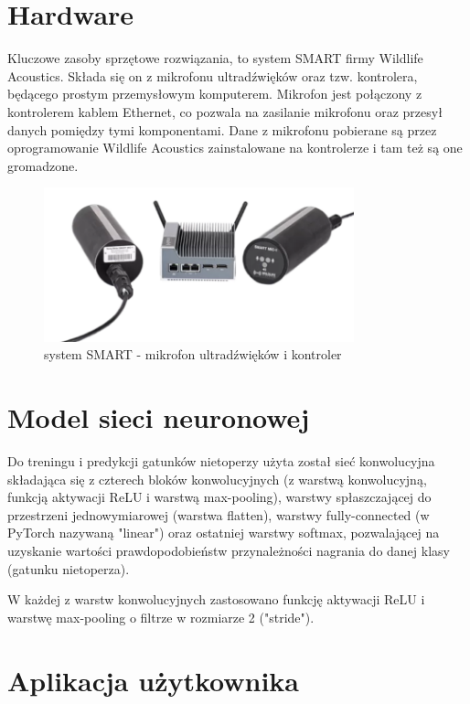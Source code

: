 \documentclass{sprz}
\begin{document}
\section{Hardware}
Kluczowe zasoby sprzętowe rozwiązania, to system SMART firmy Wildlife Acoustics. Składa się on z mikrofonu ultradźwięków oraz tzw. kontrolera, będącego prostym przemysłowym komputerem. Mikrofon jest połączony z kontrolerem kablem Ethernet, co pozwala na zasilanie mikrofonu oraz przesył danych pomiędzy tymi komponentami. Dane z mikrofonu pobierane są przez oprogramowanie Wildlife Acoustics zainstalowane na kontrolerze i tam też są one gromadzone.
\clearpage

\begin{figure}[h]
  \centering
  \includegraphics[width=0.8\textwidth]{sprz/smart2}
  \caption{system SMART - mikrofon ultradźwięków i kontroler}
  \label{img:smart2}
\end{figure}

\section{Model sieci neuronowej}
Do treningu i predykcji gatunków nietoperzy użyta został sieć konwolucyjna składająca się z czterech bloków konwolucyjnych (z warstwą konwolucyjną, funkcją aktywacji ReLU i warstwą max-pooling), warstwy spłaszczającej do przestrzeni jednowymiarowej (warstwa flatten), warstwy fully-connected (w PyTorch nazywaną "linear") oraz ostatniej warstwy softmax, pozwalającej na uzyskanie wartości prawdopodobieństw przynależności nagrania do danej klasy (gatunku nietoperza).

W każdej z warstw konwolucyjnych zastosowano funkcję aktywacji ReLU i warstwę max-pooling o filtrze w rozmiarze 2 ("stride").
\clearpage

\section{Aplikacja użytkownika}
\end{document}
